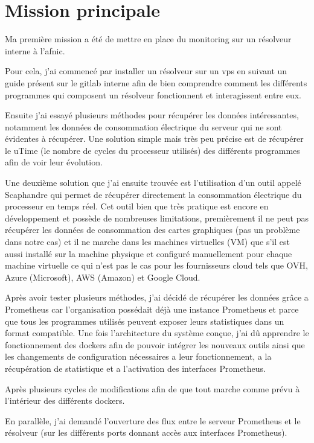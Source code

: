\setcounter{section}{0}
\section{Mission principale}
Ma première mission a été de mettre en place du monitoring sur un résolveur interne à l’afnic.

Pour cela, j’ai commencé par installer un résolveur sur un vps en suivant un guide présent sur le gitlab interne afin de bien comprendre comment les différents programmes qui composent un résolveur fonctionnent et interagissent entre eux.

Ensuite j’ai essayé plusieurs méthodes pour récupérer les données intéressantes, notamment les données de consommation électrique du serveur qui ne sont évidentes à récupérer.
Une solution simple mais très peu précise est de récupérer le uTime (le nombre de cycles du processeur utilisés) des différents programmes afin de voir leur évolution.

Une deuxième solution que j’ai ensuite trouvée est l’utilisation d’un outil appelé Scaphandre qui permet de récupérer directement la consommation électrique du processeur en temps réel. Cet outil bien que très pratique est encore en développement et possède de nombreuses limitations, premièrement il ne peut pas récupérer les données de consommation des cartes graphiques (pas un problème dans notre cas) et il ne marche dans les machines virtuelles (VM) que s’il est aussi installé sur la machine physique et configuré manuellement pour chaque machine virtuelle ce qui n’est pas le cas pour les fournisseurs cloud tels que OVH, Azure (Microsoft), AWS (Amazon) et Google Cloud.

Après avoir tester plusieurs méthodes, j’ai décidé de récupérer les données grâce a Prometheus car l’organisation possédait déjà une instance Prometheus et parce que tous les programmes utilisés peuvent exposer leurs statistiques dans un format compatible.
Une fois l’architecture du système conçue, j’ai dû apprendre le fonctionnement des dockers afin de pouvoir intégrer les nouveaux outils ainsi que les changements de configuration nécessaires a leur fonctionnement, a la récupération de statistique et a l’activation des interfaces Prometheus.

Après plusieurs cycles de modifications afin de que tout marche comme prévu à l’intérieur des différents dockers.

En parallèle, j’ai demandé l’ouverture des flux entre le serveur Prometheus et le résolveur (sur les différents ports donnant accès aux interfaces Prometheus).

